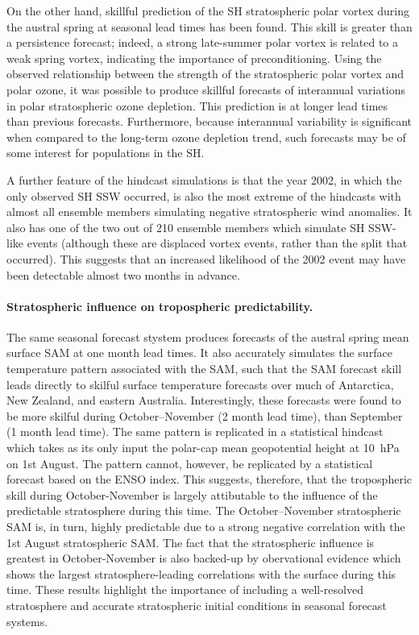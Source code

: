 On the other hand, skillful prediction of the SH stratospheric polar vortex
during the austral spring at seasonal lead times has been found. This skill is
greater than a persistence forecast; indeed, a strong late-summer polar vortex
is related to a weak spring vortex, indicating the importance of
preconditioning. Using the observed relationship between the strength of the
stratospheric polar vortex and polar ozone, it was possible to produce skillful
forecasts of interannual variations in polar stratospheric ozone depletion. This
prediction is at longer lead times than previous forecasts. Furthermore, because
interannual variability is significant when compared to the long-term ozone
depletion trend, such forecasts may be of some interest for populations in the
SH.

A further feature of the hindcast simulations is that the year 2002, in which
the only observed SH SSW occurred, is also the most extreme of the hindcasts
with almost all ensemble members simulating negative stratospheric wind
anomalies. It also has one of the two out of 210 ensemble members which simulate
SH SSW-like events (although these are displaced vortex events, rather than the
split that occurred). This suggests that an increased likelihood of the 2002
event may have been detectable almost two months in advance.

\paragraph{Stratospheric influence on tropospheric predictability.} The same
seasonal forecast stystem produces forecasts of the austral spring mean surface
SAM at one month lead times. It also accurately simulates the surface
temperature pattern associated with the SAM, such that the SAM forecast skill
leads directly to skilful surface temperature forecasts over much of Antarctica,
New Zealand, and eastern Australia. Interestingly, these forecasts were found to
be more skilful during October--November (2 month lead time), than September (1
month lead time). The same pattern is replicated in a statistical hindcast which
takes as its only input the polar-cap mean geopotential height at 10~hPa on 1st
August. The pattern cannot, however, be replicated by a statistical forecast
based on the ENSO index. This suggests, therefore, that the tropospheric skill
during October-November is largely attibutable to the influence of the
predictable stratosphere during this time. The October--November stratospheric
SAM is, in turn, highly predictable due to a strong negative correlation with
the 1st August stratospheric SAM. The fact that the stratospheric influence is
greatest in October-November is also backed-up by obervational evidence which
shows the largest stratosphere-leading correlations with the surface during this
time. These results highlight the importance of including a well-resolved
stratosphere and accurate stratospheric initial conditions in seasonal forecast
systems.

